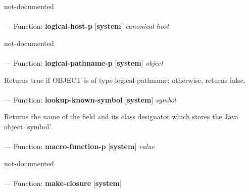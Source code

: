 \begin{adjustwidth}{5em}{5em}
not-documented
\end{adjustwidth}

\paragraph{}
\label{SYSTEM:LOGICAL-HOST-P}
--- Function: \textbf{logical-host-p} [\textbf{system}] \textit{canonical-host}

\begin{adjustwidth}{5em}{5em}
not-documented
\end{adjustwidth}

\paragraph{}
\label{SYSTEM:LOGICAL-PATHNAME-P}
--- Function: \textbf{logical-pathname-p} [\textbf{system}] \textit{object}

\begin{adjustwidth}{5em}{5em}
Returns true if OBJECT is of type logical-pathname; otherwise, returns false.
\end{adjustwidth}

\paragraph{}
\label{SYSTEM:LOOKUP-KNOWN-SYMBOL}
--- Function: \textbf{lookup-known-symbol} [\textbf{system}] \textit{symbol}

\begin{adjustwidth}{5em}{5em}
Returns the name of the field and its class designator
which stores the Java object `symbol'.
\end{adjustwidth}

\paragraph{}
\label{SYSTEM:MACRO-FUNCTION-P}
--- Function: \textbf{macro-function-p} [\textbf{system}] \textit{value}

\begin{adjustwidth}{5em}{5em}
not-documented
\end{adjustwidth}

\paragraph{}
\label{SYSTEM:MAKE-CLOSURE}
--- Function: \textbf{make-closure} [\textbf{system}] \textit{}

